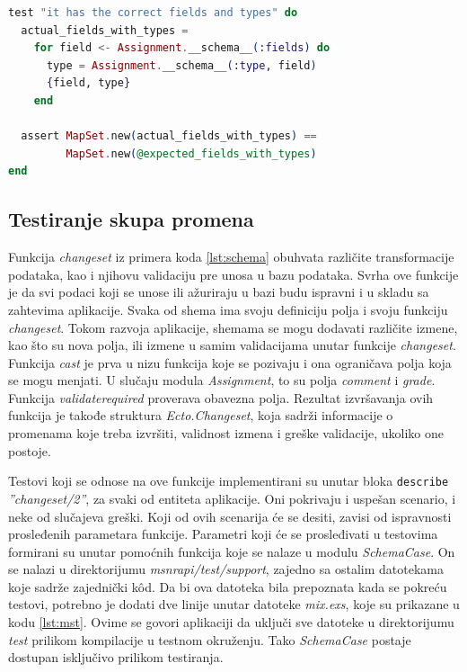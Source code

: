 \documentclass[12pt,oneside]{memoir}
\begin{document}
\begin{minipage}{\linewidth}
\begin{lstlisting}[language=elixir, basicstyle=\small, caption={Test za proveru polja i tipova tabele \emph{assignments}},captionpos=b, label={lst:testschema}]
test "it has the correct fields and types" do
  actual_fields_with_types =
    for field <- Assignment.__schema__(:fields) do
      type = Assignment.__schema__(:type, field)
      {field, type}
    end
  
  assert MapSet.new(actual_fields_with_types) ==
  	     MapSet.new(@expected_fields_with_types)
end
\end{lstlisting}
\end{minipage}

\subsection{Testiranje skupa promena}
\label{sec:change}
\par Funkcija \emph{changeset} iz primera koda \ref{lst:schema} obuhvata različite transformacije podataka, kao i njihovu validaciju pre unosa u bazu podataka. Svrha ove funkcije je da svi podaci koji se unose ili ažuriraju u bazi budu ispravni i u skladu sa zahtevima aplikacije. Svaka od shema ima svoju definiciju polja i svoju funkciju \emph{changeset}. Tokom razvoja aplikacije, shemama se mogu dodavati različite izmene, kao što su nova polja, ili izmene u samim validacijama unutar funkcije \emph{changeset}. Funkcija \emph{cast} je prva u nizu funkcija koje se pozivaju i ona ograničava polja koja se mogu menjati. U slučaju modula \emph{Assignment}, to su polja \emph{comment} i \emph{grade}. Funkcija \emph{validate{\textunderscore}required} proverava obavezna polja. Rezultat izvršavanja ovih funkcija je takođe struktura \emph{Ecto.Changeset}, koja sadrži informacije o promenama koje treba izvršiti, validnost izmena i greške validacije, ukoliko one postoje.
\par Testovi koji se odnose na ove funkcije implementirani su unutar bloka \texttt{describe} \emph{''changeset/2''}, za svaki od entiteta aplikacije. Oni pokrivaju i uspešan scenario, i neke od slučajeva greški. Koji od ovih scenarija će se desiti, zavisi od ispravnosti prosleđenih parametara funkcije. Parametri koji će se prosleđivati u testovima formirani su unutar pomoćnih funkcija koje se nalaze u modulu \emph{SchemaCase}. On se nalazi u direktorijumu \emph{msnr{\textunderscore}api/test/support}, zajedno sa ostalim datotekama koje sadrže zajednički k\^{o}d. Da bi ova datoteka bila prepoznata kada se pokreću testovi, potrebno je dodati dve linije unutar datoteke \emph{mix.exs}, koje su prikazane u kodu \ref{lst:mst}. Ovime se govori aplikaciji da uključi sve datoteke u direktorijumu \emph{test} prilikom kompilacije u testnom okruženju. Tako \emph{SchemaCase} postaje dostupan isključivo prilikom testiranja. \\
\end{document}
